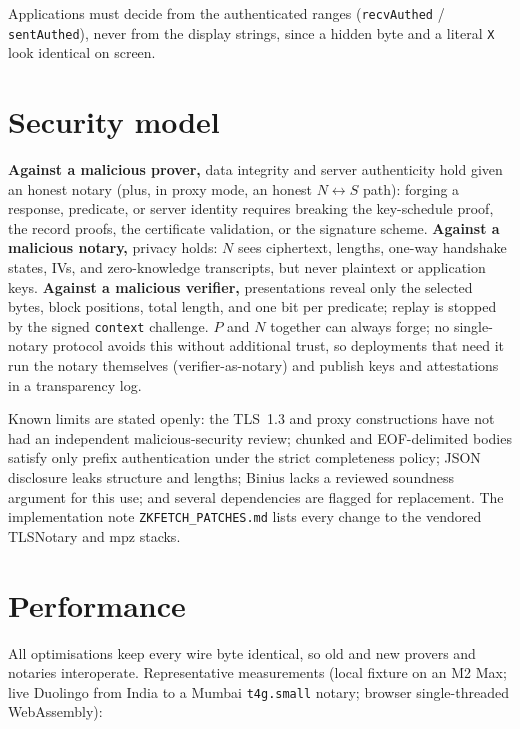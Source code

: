 \documentclass[11pt,a4paper]{article}
\begin{document}
Applications must decide from the authenticated ranges
(\texttt{recvAuthed} / \texttt{sentAuthed}), never from the display strings,
since a hidden byte and a literal \texttt{X} look identical on screen.

\section{Security model}

\textbf{Against a malicious prover,} data integrity and server authenticity
hold given an honest notary (plus, in proxy mode, an honest $N \leftrightarrow
S$ path): forging a response, predicate, or server identity requires breaking
the key-schedule proof, the record proofs, the certificate validation, or the
signature scheme.
\textbf{Against a malicious notary,} privacy holds: $N$ sees ciphertext,
lengths, one-way handshake states, IVs, and zero-knowledge transcripts, but
never plaintext or application keys.
\textbf{Against a malicious verifier,} presentations reveal only the selected
bytes, block positions, total length, and one bit per predicate; replay is
stopped by the signed \texttt{context} challenge.
$P$ and $N$ together can always forge; no single-notary protocol avoids this
without additional trust, so deployments that need it run the notary
themselves (verifier-as-notary) and publish keys and attestations in a
transparency log.

Known limits are stated openly: the TLS~1.3 and proxy constructions have not
had an independent malicious-security review; chunked and EOF-delimited bodies
satisfy only prefix authentication under the strict completeness policy;
JSON disclosure leaks structure and lengths; Binius lacks a reviewed soundness
argument for this use; and several dependencies are flagged for replacement.
The implementation note \texttt{ZKFETCH\_PATCHES.md} lists every change to the
vendored TLSNotary and mpz stacks.

\section{Performance}

All optimisations keep every wire byte identical, so old and new provers and
notaries interoperate.
Representative measurements (local fixture on an M2 Max; live Duolingo
from India to a Mumbai \texttt{t4g.small} notary; browser single-threaded
WebAssembly):
\end{document}
